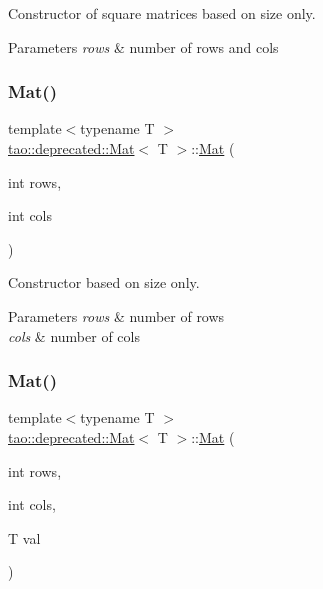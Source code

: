 Constructor of square matrices based on size only. 


\begin{DoxyParams}{Parameters}
{\em rows} & number of rows and cols \\
\hline
\end{DoxyParams}
\mbox{\label{classtao_1_1deprecated_1_1_mat_a9a367235a9d0a78d1e49cf6fdc09f620}} 
\subsubsection{\texorpdfstring{Mat()}{Mat()}\hspace{0.1cm}{\footnotesize\ttfamily [2/5]}}
{\footnotesize\ttfamily template$<$typename T $>$ \\
\mbox{\hyperlink{classtao_1_1deprecated_1_1_mat}{tao\+::deprecated\+::\+Mat}}$<$ T $>$\+::\mbox{\hyperlink{classtao_1_1deprecated_1_1_mat}{Mat}} (\begin{DoxyParamCaption}\item[{int}]{rows,  }\item[{int}]{cols }\end{DoxyParamCaption})}



Constructor based on size only. 


\begin{DoxyParams}{Parameters}
{\em rows} & number of rows \\
\hline
{\em cols} & number of cols \\
\hline
\end{DoxyParams}
\mbox{\label{classtao_1_1deprecated_1_1_mat_a323565cac6c46d7ee9934bac2482ab1e}} 
\subsubsection{\texorpdfstring{Mat()}{Mat()}\hspace{0.1cm}{\footnotesize\ttfamily [3/5]}}
{\footnotesize\ttfamily template$<$typename T $>$ \\
\mbox{\hyperlink{classtao_1_1deprecated_1_1_mat}{tao\+::deprecated\+::\+Mat}}$<$ T $>$\+::\mbox{\hyperlink{classtao_1_1deprecated_1_1_mat}{Mat}} (\begin{DoxyParamCaption}\item[{int}]{rows,  }\item[{int}]{cols,  }\item[{T}]{val }\end{DoxyParamCaption})}



